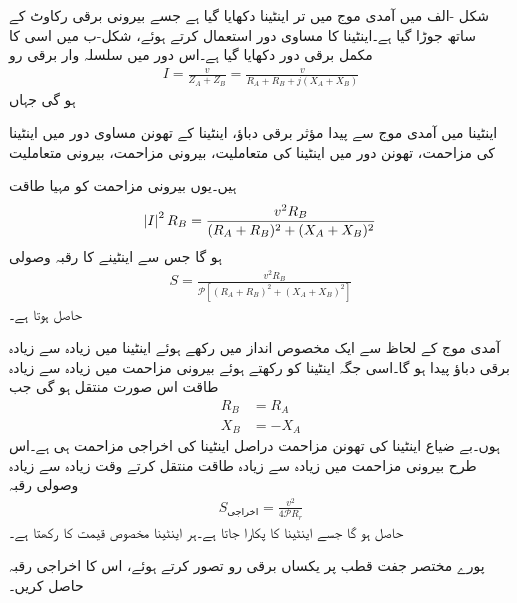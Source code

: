 شکل -الف میں آمدی موج میں تر اینٹینا دکھایا گیا ہے جسے بیرونی برقی رکاوٹ  کے ساتھ جوڑا گیا ہے۔اینٹینا کا  مساوی دور استعمال کرتے ہوئے،  شکل-ب میں اسی کا  مکمل برقی دور دکھایا گیا ہے۔اس دور میں سلسلہ وار برقی رو
\begin{align*}
I=\frac{v}{Z_A+Z_B}=\frac{v}{R_A+R_B+j(X_A+X_B)}
\end{align*}
ہو گی جہاں
\begin{description}
 اینٹینا میں آمدی موج سے پیدا مؤثر برقی دباؤ،
 اینٹینا کے تھونن مساوی دور میں اینٹینا کی مزاحمت،
 تھونن دور میں اینٹینا کی متعاملیت،
 بیرونی مزاحمت،
 بیرونی متعاملیت
\end{description}
ہیں۔یوں بیرونی مزاحمت کو مہیا طاقت 
\begin{align}
\abs{I}^2 R_B=\frac{v^2 R_B}{(R_A+R_B)^2+(X_A+X_B)^2}
\end{align}
ہو گا جس سے  اینٹینے کا رقبہ وصولی
\begin{align}
S=\frac{v^2 R_B}{\mathscr{P}\left[(R_A+R_B)^2+(X_A+X_B)^2\right]}
\end{align}
حاصل ہوتا ہے۔ 

آمدی موج کے لحاظ  سے ایک مخصوص انداز میں رکھے ہوئے اینٹینا میں زیادہ سے زیادہ برقی دباؤ پیدا ہو گا۔اسی جگہ اینٹینا کو رکھتے ہوئے بیرونی مزاحمت میں زیادہ سے زیادہ طاقت اس صورت منتقل ہو گی جب
\begin{align}
R_B&=R_A\\
X_B&=-X_A
\end{align}
ہوں۔بے ضیاع اینٹینا کی تھونن مزاحمت دراصل اینٹینا کی اخراجی مزاحمت  ہی ہے۔اس طرح بیرونی مزاحمت میں زیادہ سے زیادہ طاقت منتقل کرتے وقت زیادہ سے زیادہ وصولی رقبہ
\begin{align}\label{مساوات_اینٹینا_اخراجی_رقبہ_اینٹینا}
S_{\text{اخراجی}} = \frac{v^2}{4\mathscr{P} R_r }
\end{align}
 حاصل ہو گا جسے اینٹینا کا   پکارا جاتا ہے۔ہر اینٹینا مخصوص قیمت کا  رکھتا ہے۔

پورے مختصر جفت قطب پر یکساں برقی رو تصور کرتے ہوئے، اس کا اخراجی رقبہ حاصل کریں۔

